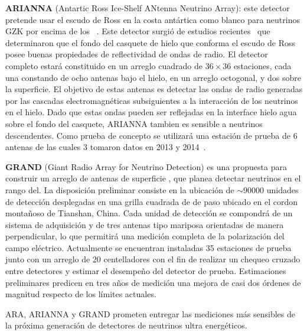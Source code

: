 	\textbf{ARIANNA} (Antartic Ross Ice-Shelf ANtenna Neutrino Array): este detector pretende usar el escudo de Ross en la costa ant\'artica como blanco para neutrinos GZK por encima de los ~\cite{cite:ARIANNA}.
	Este detector surgi\'o de estudios recientes~\cite{cite:ARIANNA2} que determinaron que el fondo del casquete de hielo que conforma el escudo de Ross posee buenas propiedades de reflectividad de ondas de radio.
	El detector completo estar\'a constituido en un arreglo cuadrado de $36\times36$ estaciones, cada una constando de ocho antenas bajo el hielo, en un arreglo octogonal, y dos sobre la superficie.
	El objetivo de estas antenas es detectar las ondas de radio generadas por las cascadas electromagn\'eticas subsiguientes a la interacci\'on de los neutrinos en el hielo. Dado que estas ondas pueden ser reflejadas en la interface hielo agua sobre el fondo del casquete, ARIANNA tambien es sensible a neutrinos descendentes.
	Como prueba de concepto se utilizar\'a una estaci\'on de prueba de 6 antenas de las cuales 3 tomaron datos en 2013 y 2014~\cite{cite:ARIANNA3}.
	
	\textbf{GRAND} (Giant Radio Array for Neutrino Detection) es una propuesta para construir un arreglo de antenas de superficie , que planea detectar neutrinos en el rango del. 
	La disposici\'on preliminar consiste en la ubicaci\'on de $\sim90000$ unidades de detecci\'on desplegadas en una grilla cuadrada de  de paso ubicado en el cordon monta\~noso de Tianshan, China.
	Cada unidad de detecci\'on se compondr\'a de un sistema de adquisici\'on y de tres antenas tipo mariposa orientadas de manera perpendicular, lo que permitir\'a una medici\'on completa de la polarizaci\'on del campo el\'ectrico. 
	Actualmente se encuentran instaladas 35 estaciones de prueba junto con un arreglo de 20 centelladores con el fin de realizar un chequeo cruzado entre detectores y estimar el desempe\~no del detector de prueba.
	Estimaciones preliminares predicen en tres a\~nos de medici\'on una mejora de casi dos \'ordenes de magnitud respecto de los l\'imites actuales.
	
	ARA, ARIANNA y GRAND prometen entregar las mediciones m\'as sensibles de la pr\'oxima generaci\'on de detectores de neutrinos ultra energ\'eticos.

% 

